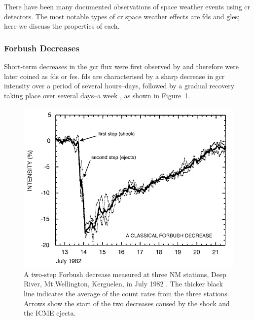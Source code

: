 There have been many documented observations of space weather events using \gls{cr} detectors. The most notable types of \gls{cr} space weather effects are \glspl{fd} and \glspl{gle}; here we discuss the properties of each.

\subsubsection*{Forbush Decreases}\label{sec:intro_FDs}

Short-term decreases in the \gls{gcr} flux were first observed by  \citet{forbush_effects_1937} and therefore were later coined as \glspl{fd} or \glspl{fe}. \glspl{fd} are characterised by a sharp decrease in \gls{gcr} intensity over a period of several hours--days, followed by a gradual recovery taking place over several days--a week \citep{cane_coronal_2000, belov_forbush_2008, wawrzynczak_modeling_2010}, as shown in Figure~\ref{fig:FD_plot}.

\begin{figure}[htb!]
	\centering
	\includegraphics[width=0.75\columnwidth]{FD_plot.png}
	\caption{A two-step Forbush decrease measured at three NM stations, Deep River, Mt.Wellington, Kerguelen, in July 1982 \citep{cane_coronal_2000}. The thicker black line indicates the average of the count rates from the three stations. Arrows show the start of the two decreases caused by the shock and the ICME ejecta.}
	\label{fig:FD_plot}
\end{figure}

